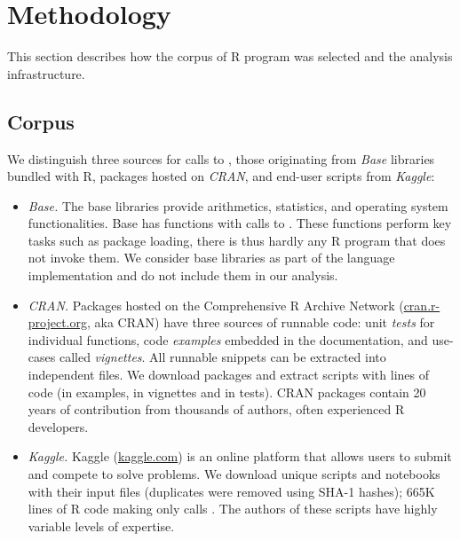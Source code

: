 \documentclass[acmsmall, screen]{acmart}
\begin{document}
\section{Methodology}

This section describes how the corpus of R program was selected and the analysis
infrastructure.

\subsection{Corpus}

We distinguish three sources for calls to \eval, those originating from
\emph{Base} libraries bundled with R, packages hosted on \emph{CRAN}, and
end-user scripts from \emph{Kaggle}:

\begin{itemize}[$-$]

\item \emph{Base.} The \BasePackages base libraries provide arithmetics,
  statistics, and operating system functionalities. Base has \BaseFunsWithEvals
  functions with \BaseEvalCallSites calls to \eval. These functions perform key
  tasks such as package loading, there is thus hardly any R program that does
  not invoke them. We consider base libraries as part of the language
  implementation and do not include them in our analysis.

\item \emph{CRAN.} Packages hosted on the Comprehensive R Archive Network
  ({\small \url{cran.r-project.org}}, aka CRAN) have three sources of runnable code:
  unit \emph{tests} for individual functions, code \emph{examples} embedded in
  the documentation, and use-cases called \emph{vignettes}. All runnable
  snippets can be extracted into independent files. We download \CranPackages
  packages and extract \CranRunnableScripts scripts with \CranRunnableCode
  lines of code (\CranRunnableCodeExamplesRnd in examples,
  \CranRunnableCodeVignettesRnd in vignettes and \CranRunnableCodeTestsRnd in
  tests). CRAN packages contain 20 years of contribution from
  thousands of authors, often experienced R developers.

\item \emph{Kaggle.} Kaggle ({\small \url{kaggle.com}}) is an online platform
  that allows users to submit and compete to solve problems. We download
  \KaggleUnique unique scripts and notebooks with their input files
  (\KaggleDuplicates duplicates were removed using SHA-1 hashes); 665K lines of
  R code making only \KaggleWithEvals calls \eval. The authors of these scripts
  have highly variable levels of expertise.

\end{itemize}
\end{document}
